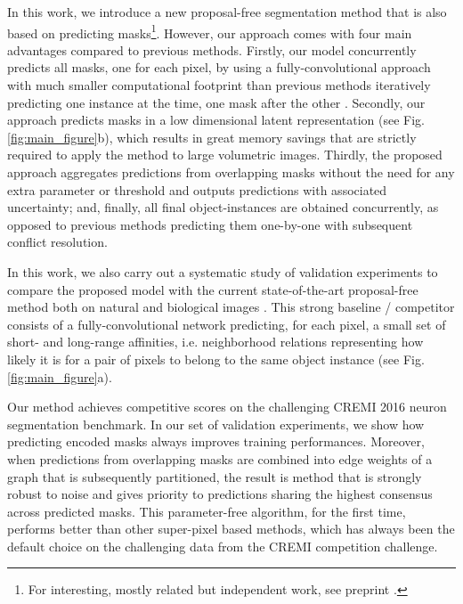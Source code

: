 In this work, we introduce a new proposal-free segmentation method that is also based on predicting \maskname masks\footnote{For interesting, mostly related but independent work, see preprint \cite{hirsch2020patchperpix}.}. However, our approach comes with four main advantages compared to previous methods.
Firstly, our model concurrently predicts all \maskname masks, one for each pixel, by using a fully-convolutional approach with much smaller computational footprint than previous methods iteratively predicting one instance at the time, one mask after the other \cite{januszewski2018high,meirovitch2016multi}.
Secondly, our approach predicts \maskname masks in a low dimensional latent representation (see Fig. \ref{fig:main_figure}b), which results in great memory savings that are strictly required to apply the method to large volumetric images. 
Thirdly, the proposed approach aggregates predictions from overlapping \maskname masks without the need for any extra parameter or threshold and outputs predictions with associated uncertainty;
and, finally, all final object-instances are obtained concurrently, as opposed to previous methods predicting them one-by-one with subsequent conflict resolution. 


In this work, we also carry out a systematic study of validation experiments to compare the proposed model with the current state-of-the-art proposal-free method both on natural and biological images \cite{liu2018affinity,Gao_2019_ICCV,lee2017superhuman,wolf2018mutex,bailoni2019generalized}. This strong baseline / competitor consists of a fully-convolutional network predicting, for each pixel, a small set of short- and long-range affinities, i.e. neighborhood relations representing how likely it is for a pair of pixels to belong to the same object instance (see Fig. \ref{fig:main_figure}a). 

Our method achieves competitive scores on the challenging CREMI 2016 neuron segmentation benchmark. In our set of validation experiments, we show how predicting encoded \maskname masks always improves training performances. Moreover, when predictions from overlapping masks are combined into edge weights of a graph that is subsequently partitioned, the result is method that is strongly robust to noise and gives priority to predictions sharing the highest consensus across predicted masks. 
This parameter-free algorithm, for the first time, performs better than other super-pixel based methods, which has always been the default choice on the challenging data from the CREMI competition challenge.


